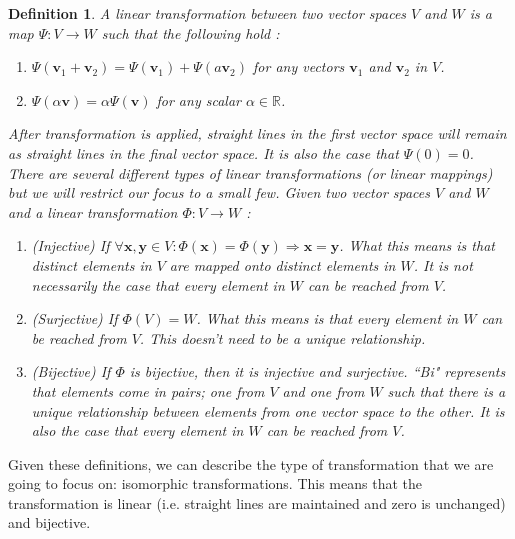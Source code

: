 \documentclass[a4paper,12pt]{article}
\newcommand{\vectr}[1]{\textbf{#1}}
\newcommand{\real}{\mathbb{R}}
\newcommand{\vecspace}[1]{#1}
\newtheorem{definition}{Definition}[section]
\begin{document}
	\begin{definition}
		\normalfont A linear transformation between two vector spaces $ \vecspace{V} $ and $ \vecspace{W} $ is a map $ \Psi: \vecspace{V} \rightarrow \vecspace{W} $ such that the following hold \cite{def_lin_trans}:
		\begin{enumerate}
			\item $ \Psi(\vectr{v}_1 + \vectr{v}_2) = \Psi(\vectr{v}_1) + \Psi(a\vectr{v}_2)$ for any vectors $ \vectr{v}_1 $ and $ \vectr{v}_2 $ in $ \vecspace{V} $.
			\item $ \Psi(\alpha \vectr{v}) = \alpha \Psi(\vectr{v})$ for any scalar $ \alpha \in \real $.  
		\end{enumerate}
		After transformation is applied, straight lines in the first vector space will remain as straight lines in the final vector space. It is also the case that $ \Psi(0) = 0 $. There are several different types of linear transformations (or linear mappings) but we will restrict our focus to a small few. Given two vector spaces $ \vecspace{V} $ and $ \vecspace{W} $ and a linear transformation $ \Phi: \vecspace{V} \rightarrow \vecspace{W} $ \cite[page 48]{mml_book}:
		\begin{enumerate}
			\item (Injective) If $ \forall \vectr{x}, \vectr{y} \in \vecspace{V}: \Phi(\vectr{x}) = \Phi(\vectr{y}) \Longrightarrow \vectr{x} = \vectr{y}$. What this means is that distinct elements in $ \vecspace{V} $ are mapped onto distinct elements in $ \vecspace{W} $. It is not necessarily the case that every element in $ \vecspace{W} $ can be reached from $ \vecspace{V} $. 
			\item (Surjective) If $ \Phi(\vecspace{V}) = \vecspace{W}$. What this means is that every element in $ \vecspace{W} $ can be reached from $ \vecspace{V} $. This doesn't need to be a unique relationship. 
			\item (Bijective) If $ \Phi $ is bijective, then it is injective and surjective. ``Bi" represents that elements come in pairs; one from $ \vecspace{V} $ and one from $ \vecspace{W} $ such that there is a unique relationship between elements from one vector space to the other. It is also the case that every element in $ \vecspace{W} $ can be reached from $ \vecspace{V} $.
		\end{enumerate}
	\end{definition}
	Given these definitions, we can describe the type of transformation that we are going to focus on: isomorphic transformations. This means that the transformation is linear (i.e. straight lines are maintained and zero is unchanged) and bijective. 
\end{document}
